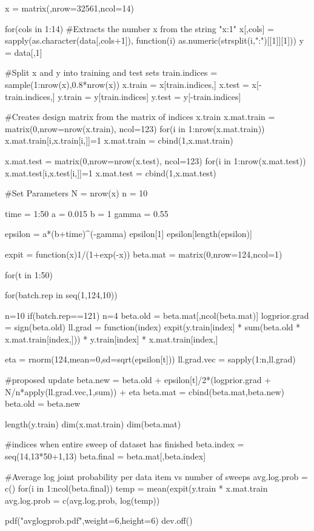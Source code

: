\documentclass[letterpaper,12pt]{amsart}
\newenvironment{verbatimcode}{\bigskip \scriptsize \verbatim}{\endverbatim \normalsize \bigskip}
\begin{document}
\begin{enumerate}[1.]
\begin{verbatimcode}
x = matrix(,nrow=32561,ncol=14)

for(cols in 1:14)
{
  #Extracts the number x from the string "x:1"
  x[,cols] = sapply(as.character(data[,cols+1]), function(i) as.numeric(strsplit(i,":")[[1]][1]))
}
y = data[,1]

#Split x and y into training and test sets
train.indices = sample(1:nrow(x),0.8*nrow(x))
x.train = x[train.indices,]
x.test = x[-train.indices,]
y.train = y[train.indices]
y.test = y[-train.indices]

#Creates design matrix from the matrix of indices x.train
x.mat.train = matrix(0,nrow=nrow(x.train), ncol=123)
for(i in 1:nrow(x.mat.train))
  x.mat.train[i,x.train[i,]]=1
x.mat.train = cbind(1,x.mat.train)

x.mat.test = matrix(0,nrow=nrow(x.test), ncol=123)
for(i in 1:nrow(x.mat.test))
  x.mat.test[i,x.test[i,]]=1
x.mat.test = cbind(1,x.mat.test)


#Set Parameters
N = nrow(x)
n = 10

time = 1:50
a = 0.015
b = 1
gamma = 0.55

epsilon = a*(b+time)^(-gamma)
epsilon[1]
epsilon[length(epsilon)]

expit = function(x){1/(1+exp(-x))}
beta.mat = matrix(0,nrow=124,ncol=1)

for(t in 1:50)
{
  for(batch.rep in seq(1,124,10))
  {
    n=10
    if(batch.rep==121)
      n=4
    beta.old = beta.mat[,ncol(beta.mat)]
    logprior.grad = sign(beta.old)
    ll.grad = function(index)
    {
      expit(y.train[index] * sum(beta.old * x.mat.train[index,])) * y.train[index] * x.mat.train[index,]
    }

    eta = rnorm(124,mean=0,sd=sqrt(epsilon[t]))
    ll.grad.vec = sapply(1:n,ll.grad)

    #proposed update
    beta.new = beta.old + epsilon[t]/2*(logprior.grad + N/n*apply(ll.grad.vec,1,sum)) + eta
    beta.mat = cbind(beta.mat,beta.new)
    beta.old = beta.new
  }
}

length(y.train)
dim(x.mat.train)
dim(beta.mat)

#indices when entire sweep of dataset has finished
beta.index = seq(14,13*50+1,13)
beta.final = beta.mat[,beta.index]

#Average log joint probability per data item vs number of sweeps
avg.log.prob = c()
for(i in 1:ncol(beta.final))
{
  temp = mean(expit(y.train * x.mat.train %
  avg.log.prob = c(avg.log.prob, log(temp))
}

pdf("avglogprob.pdf",weight=6,height=6)
dev.off()



\end{verbatimcode}
\end{enumerate}
\end{document}
